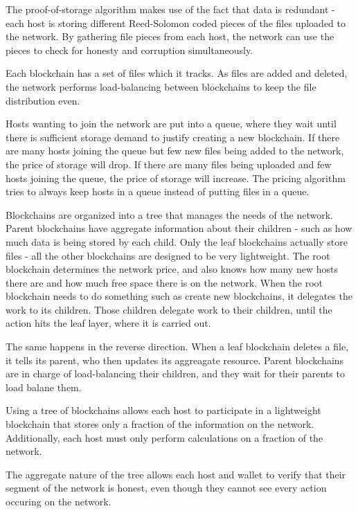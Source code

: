 \documentclass[twocolumn]{article}
\begin{document}
The proof-of-storage algorithm makes use of the fact that data is redundant - each host is storing different Reed-Solomon coded pieces of the files uploaded to the network.
By gathering file pieces from each host, the network can use the pieces to check for honesty and corruption simultaneously.

Each blockchain has a set of files which it tracks.
As files are added and deleted, the network performs load-balancing between blockchains to keep the file distribution even.

Hosts wanting to join the network are put into a queue, where they wait until there is sufficient storage demand to justify creating a new blockchain.
If there are many hosts joining the queue but few new files being added to the network, the price of storage will drop.
If there are many files being uploaded and few hosts joining the queue, the price of storage will increase.
The pricing algorithm tries to always keep hosts in a queue instead of putting files in a queue.

Blockchains are organized into a tree that manages the needs of the network.
Parent blockchains have aggregate information about their children - such as how much data is being stored by each child.
Only the leaf blockchains actually store files - all the other blockchains are designed to be very lightweight.
The root blockchain determines the network price, and also knows how many new hosts there are and how much free space there is on the network.
When the root blockchain needs to do something such as create new blockchains, it delegates the work to its children.
Those children delegate work to their children, until the action hits the leaf layer, where it is carried out.

The same happens in the reverse direction.
When a leaf blockchain deletes a file, it tells its parent, who then updates its aggreagate resource.
Parent blockchains are in charge of load-balancing their children, and they wait for their parents to load balane them.

Using a tree of blockchains allows each host to participate in a lightweight blockchain that stores only a fraction of the information on the network.
Additionally, each host must only perform calculations on a fraction of the network.

The aggregate nature of the tree allows each host and wallet to verify that their segment of the network is honest, even though they cannot see every action occuring on the network.
\end{document}
